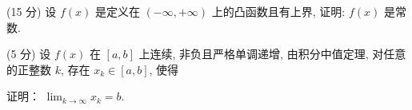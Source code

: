 (15 分) 设 $f(x)$ 是定义在 $(- \infty, +\infty)$ 上的凸函数且有上界, 证明: $f(x)$ 是常数.\par
\par{}
(5 分) 设 $f(x)$ 在 $[a, b]$ 上连续, 非负且严格单调递增, 由积分中值定理, 对任意的正整数 $k$, 存在 $x_k \in [a, b]$, 使得\par
\nopagebreak[4]
证明： $\lim_{k\to \infty}x_k = b.$\par
